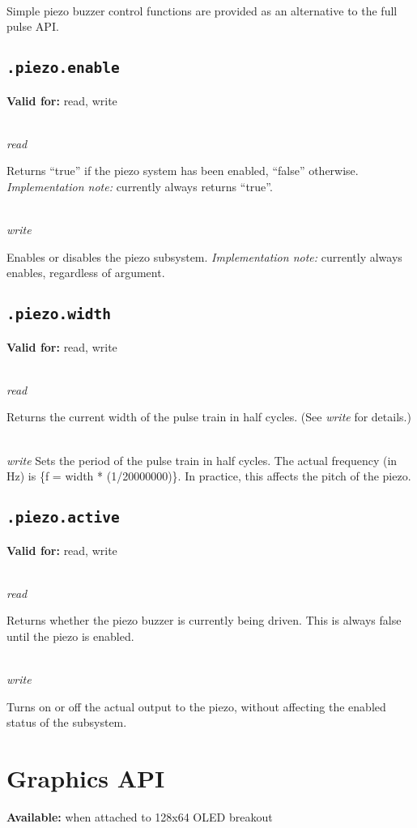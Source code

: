 \documentclass{article}
\begin{document}
~\\
Simple piezo buzzer control functions are provided as an alternative to the full pulse API.

\subsection{\texttt{.piezo.enable}}
\textbf{Valid for:} read, write

~\\
\textit{read}

Returns ``true'' if the piezo system has been enabled, ``false'' otherwise. \textit{Implementation note:} currently always returns ``true''.

~\\
\textit{write}

Enables or disables the piezo subsystem. \textit{Implementation note:} currently always enables, regardless of argument.

\subsection{\texttt{.piezo.width}}
\textbf{Valid for:} read, write

~\\
\textit{read}

Returns the current width of the pulse train in half cycles. (See \textit{write} for details.) 

~\\
\textit{write}
Sets the period of the pulse train in half cycles. The actual frequency (in Hz) is \{f = width * (1/20000000)\}. In practice, this affects the pitch of the piezo.

\subsection{\texttt{.piezo.active}}
\textbf{Valid for:} read, write

~\\
\textit{read}

Returns whether the piezo buzzer is currently being driven. This is always false until the piezo is enabled.

~\\
\textit{write}

Turns on or off the actual output to the piezo, without affecting the enabled status of the subsystem.

\section{Graphics API}
\textbf{Available:} when attached to 128x64 OLED breakout
\end{document}

